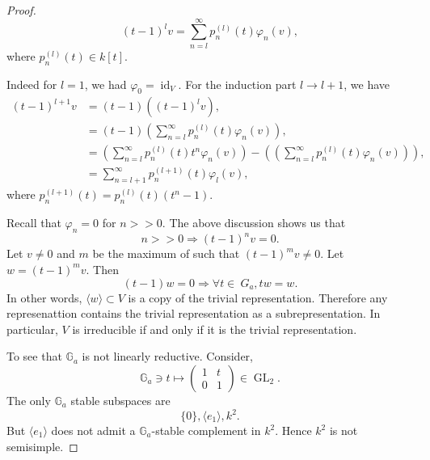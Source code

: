 \documentclass[10pt]{article}
\numberwithin{equation}{theorem}
\DeclareMathOperator{\GL}{GL}
\DeclareMathOperator{\id}{id}
\newcommand{\G}[0]{\mathbb{G}}
\begin{document}
\begin{proof}
    \begin{equation*}
      (t-1)^lv = \sum_{n=l}^\infty p_n^{(l)}(t)\varphi_n(v),
    \end{equation*}
    where $p_n^{(l)}(t)\in k[t]$.
    \par Indeed for $l=1$, we had $\varphi_0 = \id_V$. For the induction part $l\to l+1$, we have 
    \begin{align*}
      (t-1)^{l+1}v & = (t-1)((t-1)^lv),\\
      & = (t-1)\left(\sum_{n=l}^\infty p^{(l)}_n(t)\varphi_n(v)\right),\\
      & = \left(\sum_{n=l}^\infty p^{(l)}_n(t)t^n\varphi_n(v)\right)-\left(\left(\sum_{n=l}^\infty p^{(l)}_n(t)\varphi_n(v)\right)\right),\\
      & = \sum_{n=l+1}^\infty p_n^{(l+1)}(t)\varphi_l(v),
    \end{align*}
    where $p_n^{(l+1)}(t) = p_n^{(l)}(t)(t^n-1)$.
    \par Recall that $\varphi_n=0$ for $n>>0$. The above discussion shows us that
    \begin{equation*}
      n>>0\Rightarrow (t-1)^nv = 0.
    \end{equation*}
    Let $v\not=0$ and $m$ be the maximum of such that $(t-1)^mv \not =0$. Let $w = (t-1)^mv$. Then 
    \begin{equation*}
      (t-1)w = 0\Rightarrow \forall t\in\ G_a, tw = w.
    \end{equation*}
    In other words, $\langle w\rangle\subset V$ is a copy of the trivial representation. Therefore any represenattion contains the trivial representation as a subrepresentation.
    In particular, $V$ is irreducible if and only if it is the trivial representation.
    \par To see that $\G_a$ is not linearly reductive. Consider,
    \begin{equation*}
      \G_a\ni t\mapsto\begin{pmatrix}
        1 & t\\
        0 & 1
      \end{pmatrix}\in\GL_2.
    \end{equation*}
    The only $\G_a$ stable subspaces are 
    \begin{equation*}
      \{0\},\langle e_1\rangle, k^2.
    \end{equation*}
    But $\langle e_1\rangle$ does not admit a $\G_a$-stable complement in $k^2$. Hence $k^2$ is not semisimple.
\end{proof}
\end{document}
